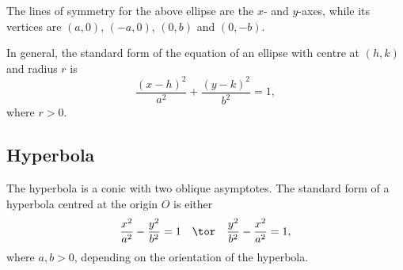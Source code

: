 The lines of symmetry for the above ellipse are the $x$- and $y$-axes, while its vertices are $(a,0)$, $(-a, 0)$, $(0, b)$ and $(0, -b)$.

In general, the standard form of the equation of an ellipse with centre at $(h, k)$ and radius $r$ is \[\frac{(x-h)^2}{a^2} + \frac{(y-k)^2}{b^2} = 1,\] where $r > 0$.

\subsection{Hyperbola}

The hyperbola is a conic with two oblique asymptotes. The standard form of a hyperbola centred at the origin $O$ is either \[\frac{x^2}{a^2} - \frac{y^2}{b^2} = 1 \quad \tor \quad \frac{y^2}{b^2} - \frac{x^2}{a^2} = 1,\] where $a, b > 0$, depending on the orientation of the hyperbola.

